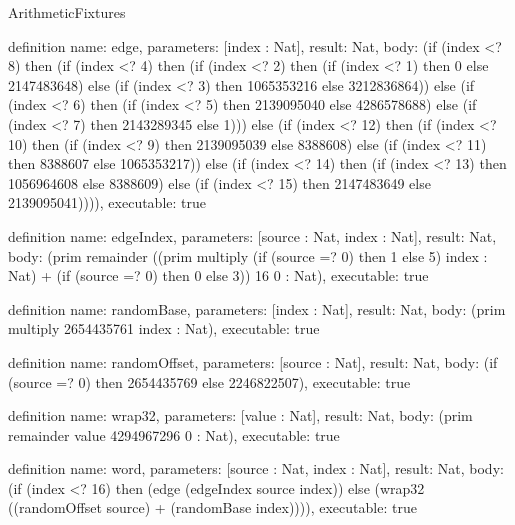 \begin{lexlean}{ArithmeticFixtures}
\begin{semanticmodule}
definition{
  name: edge,
  parameters: [index : Nat],
  result: Nat,
  body: (if (index <? 8) then (if (index <? 4) then (if (index <? 2) then (if (index <? 1) then 0 else 2147483648) else (if (index <? 3) then 1065353216 else 3212836864)) else (if (index <? 6) then (if (index <? 5) then 2139095040 else 4286578688) else (if (index <? 7) then 2143289345 else 1))) else (if (index <? 12) then (if (index <? 10) then (if (index <? 9) then 2139095039 else 8388608) else (if (index <? 11) then 8388607 else 1065353217)) else (if (index <? 14) then (if (index <? 13) then 1056964608 else 8388609) else (if (index <? 15) then 2147483649 else 2139095041)))),
  executable: true
}

definition{
  name: edgeIndex,
  parameters: [source : Nat, index : Nat],
  result: Nat,
  body: (prim remainder ((prim multiply (if (source =? 0) then 1 else 5) index : Nat) + (if (source =? 0) then 0 else 3)) 16 0 : Nat),
  executable: true
}

definition{
  name: randomBase,
  parameters: [index : Nat],
  result: Nat,
  body: (prim multiply 2654435761 index : Nat),
  executable: true
}

definition{
  name: randomOffset,
  parameters: [source : Nat],
  result: Nat,
  body: (if (source =? 0) then 2654435769 else 2246822507),
  executable: true
}

definition{
  name: wrap32,
  parameters: [value : Nat],
  result: Nat,
  body: (prim remainder value 4294967296 0 : Nat),
  executable: true
}

definition{
  name: word,
  parameters: [source : Nat, index : Nat],
  result: Nat,
  body: (if (index <? 16) then (edge (edgeIndex source index)) else (wrap32 ((randomOffset source) + (randomBase index)))),
  executable: true
}


\end{semanticmodule}
\end{lexlean}
